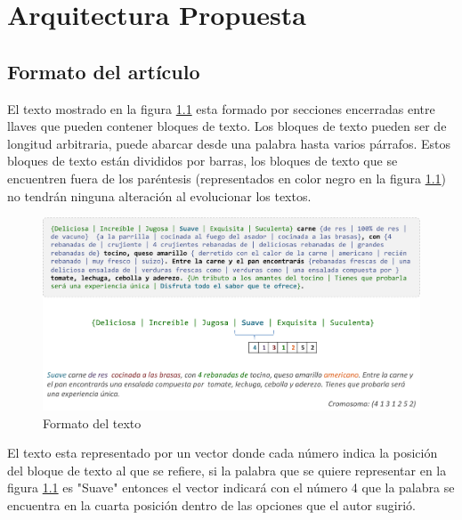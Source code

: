 
\chapter{Arquitectura Propuesta}

\section{Formato del artículo}

El texto mostrado en la figura \ref{formato} esta formado por secciones encerradas entre llaves que pueden contener  bloques de texto. Los bloques de texto pueden ser de longitud arbitraria, puede abarcar desde una palabra hasta varios párrafos. Estos bloques de texto están divididos por barras, los bloques de texto que se encuentren fuera de los paréntesis (representados en color negro en la figura \ref{formato}) no tendrán ninguna alteración al evolucionar los textos.

\begin{figure}[htp]
  \centerline{\includegraphics[width=6in]{formato.png}} 
  \caption{Formato del texto} 
\label{formato}
\end{figure}


El texto esta representado por un vector donde cada número indica la posición del bloque de texto al que se refiere, si la palabra que se quiere representar en la figura \ref{formato} es "Suave" entonces el vector indicará con el número 4 que la palabra se encuentra en la cuarta posición dentro de las opciones que el autor sugirió.



